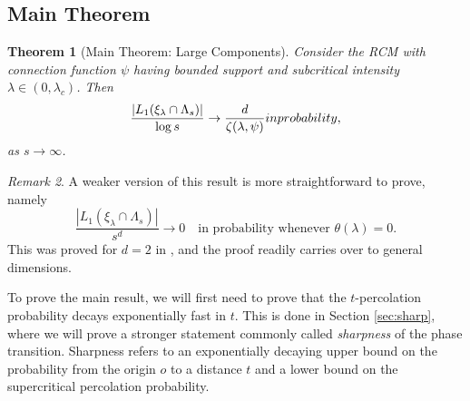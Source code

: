 \documentclass[a4paper,12pt]{scrartcl}
\newcommand{\conn}{\psi}
\newcommand{\E}{\mathbb{E}}
\renewcommand{\P}{\mathbb{P}}
\newcommand{\eps}{\varepsilon}
\newtheorem{theorem}{Theorem}[section]
\theoremstyle{definition}
\theoremstyle{remark}
\newtheorem{remark}[theorem]{Remark}
\begin{document}
\subsection{Main Theorem}
\begin{theorem}[Main Theorem: Large Components]\label{thm:main_large}
  Consider the RCM with connection function $\conn$  having bounded support and subcritical intensity $\lambda\in(0, \lambda_c)$. Then
  $$
  \frac{|L_1(\xi_{\lambda}\cap \Lambda_s)|}{\log s}
  \to
  \frac{d}{\zeta(\lambda, \psi)}
  \textup{ in probability},
  $$
  as $s\rightarrow\infty$.
\end{theorem}
\begin{remark}
  A weaker version of this result is more straightforward to prove,
  namely
  \begin{equation}
    \frac{|L_1(\xi_{\lambda}\cap\Lambda_s)|}{s^d}
    \to 0
    \quad \text{in probability whenever }  \theta(\lambda) =0.
  \end{equation}
  This was proved for $d=2$ in \cite[Theorem 1.1]{pen_giant_comp_srgg},
  and the proof readily carries over to general dimensions.

\end{remark}

To prove the main result, we will first need to prove that the $t$-percolation probability decays exponentially fast in $t$. This is done in Section \ref{sec:sharp}, where we will prove a stronger statement commonly called \emph{sharpness} of the phase transition. Sharpness refers to an exponentially decaying
upper bound on the probability from the origin $o$ to a distance $t$ and a lower bound on the supercritical percolation probability.

\end{document}
